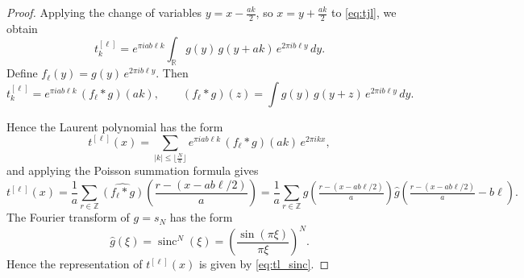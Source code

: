 \documentclass[10pt,a4paper]{amsart}
\DeclareMathOperator{\sinc}{sinc}
\begin{document}
  \begin{proof}  

Applying the change of variables \(y = x - \tfrac{a k}{2}\), so \(x = y + \tfrac{a k}{2}\) to \eqref{eq:tjl}, we obtain
\begin{equation*}
t^{[\ell]}_k 
= e^{\pi i a b \ell k}
  \int_{\mathbb{R}} g(y)\, g(y + a k)\, e^{2\pi i b \ell y}\,dy.
\end{equation*}
Define \(f_\ell(y) = g(y)\,e^{2\pi i b \ell y}\).
Then
\begin{equation*}
t^{[\ell]}_k 
= e^{\pi i a b \ell k}\, (f_\ell * g)(a k),
\qquad 
(f_\ell * g)(z) = \int g(y)\, g(y+z)\, e^{2\pi i b \ell y}\,dy.
\end{equation*}

Hence the Laurent polynomial has the form
\begin{equation*}
t^{[\ell]}(x)
= \sum_{|k|\leq \lfloor \frac{N}{a} \rfloor} e^{\pi i a b \ell k}\, (f_\ell * g)(a k)\, e^{2\pi i k x},
\end{equation*}
and applying the Poisson summation formula gives
\begin{equation*}
t^{[\ell]}(x)
= \frac{1}{a}\sum_{r\in\mathbb{Z}}
  \widehat{(f_\ell * g)}\!\left(\frac{r - (x - a b \ell/2)}{a}\right)= \frac{1}{a}\sum_{r\in\mathbb{Z}}
   \widehat{g}\!\left(\tfrac{r - (x - a b \ell/2)}{a}\right)
   \widehat{g}\!\left(\tfrac{r - (x - a b \ell/2)}{a} - b\ell\right).
\end{equation*}
The Fourier transform of $g=s_N$ has the form
\begin{equation*}
\widehat{g}(\xi)
= \sinc^N(\xi)
= \left(\frac{\sin(\pi \xi)}{\pi \xi}\right)^N.
\end{equation*}
Hence the representation of $t^{[\ell]}(x)$ is given by
\eqref{eq:tl_sinc}. 

\end{proof}
\end{document}
